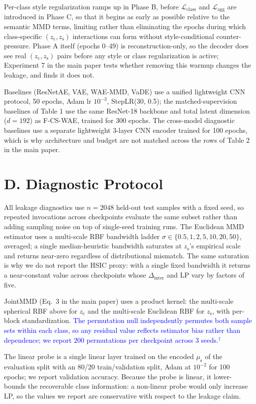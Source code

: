\documentclass[letterpaper]{article} %
\newcommand{\pj}[1]{\textcolor{blue}{#1$^{\dagger}$}}
\newcommand{\ours}{F-CS-WAE}
\newcommand{\zc}{z_{\mathrm{c}}}
\newcommand{\zs}{z_{\mathrm{s}}}
\newcommand{\mus}{\mu_{\mathrm{s}}}
\newcommand{\Dinter}{\Delta_{\mathrm{inter}}}
\begin{document}
Per-class style regularization ramps up in Phase B, before
$\mathcal{L}_{\mathrm{class}}$ and $\mathcal{L}_{\mathrm{agg}}$ are
introduced in Phase C, so that it begins as early as possible relative to the
semantic MMD terms, limiting rather than eliminating the epochs during which
class-specific $(\zc,\zs)$ interactions can form without style-conditional
counter-pressure. Phase A itself (epochs 0--49) is reconstruction-only, so
the decoder does see real $(\zc,\zs)$ pairs before any style or class
regularization is active; Experiment 7 in the main paper tests whether
removing this warmup changes the leakage, and finds it does not.

Baselines (ResNetAE, VAE, WAE-MMD, VaDE) use a unified lightweight CNN
protocol, 50 epochs, Adam lr $10^{-3}$, StepLR(30, 0.5); the matched-supervision
baselines of Table 1 use the same ResNet-18 backbone and total latent
dimension ($d{=}192$) as \ours{}, trained for 300 epochs. The cross-model
diagnostic baselines use a separate lightweight 3-layer CNN encoder trained
for 100 epochs, which is why architecture and budget are not matched across
the rows of Table 2 in the main paper.

\section{D. Diagnostic Protocol}

All leakage diagnostics use $n{=}2048$ held-out test samples with a fixed
seed, so repeated invocations across checkpoints evaluate the same subset
rather than adding sampling noise on top of single-seed training runs. The
Euclidean MMD estimator uses a multi-scale RBF bandwidth ladder
$\sigma\in\{0.5,1,2,5,10,20,50\}$, averaged; a single median-heuristic
bandwidth saturates at $\zs$'s empirical scale and returns near-zero
regardless of distributional mismatch. The same saturation is why we do not
report the HSIC proxy: with a single fixed bandwidth it returns a
near-constant value across checkpoints whose $\Dinter$ and LP vary by factors
of five.

JointMMD (Eq.~3 in the main paper) uses a product kernel: the multi-scale
spherical RBF above for $\zc$ and the multi-scale Euclidean RBF for $\zs$,
with per-block standardization. \pj{The permutation null independently
permutes both sample sets within each class, so any residual value reflects
estimator bias rather than dependence; we report $200$ permutations per
checkpoint across 3 seeds.}

The linear probe is a single linear layer trained on the encoded $\mus$ of
the evaluation split with an 80/20 train/validation split, Adam at $10^{-2}$
for 100 epochs; we report validation accuracy. Because the probe is linear,
it lower-bounds the recoverable class information: a non-linear probe would
only increase LP, so the values we report are conservative with respect to
the leakage claim.
\end{document}
